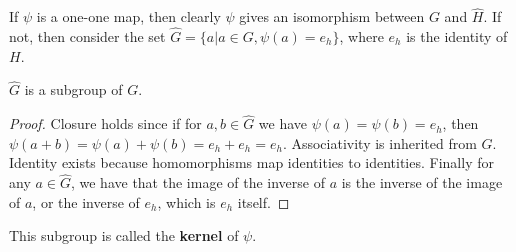 If $\psi$ is a one-one map, then clearly $\psi$ gives an isomorphism between $G$ and $\widehat{H}$.
If not, then consider the set $\widehat{G} = \{a | a \in G, \psi(a) = e_{h} \}$, where $e_{h}$ is the identity of $H$.
\begin{lemma} \label{lem:kernelsubgroup}
  $\widehat{G}$ is a subgroup of $G$.
\end{lemma}
\begin{proof}
  Closure holds since if for $a, b \in \widehat{G}$ we have $\psi(a) = \psi(b) = e_{h}$, then $\psi(a + b) = \psi(a) + \psi(b) = e_{h} + e_{h} = e_{h}$.
  Associativity is inherited from $G$.
  Identity exists because homomorphisms map identities to identities.
  Finally for any $a \in \widehat{G}$, we have that the image of the inverse of $a$ is the inverse of the image of $a$, or the inverse of $e_{h}$, which is $e_{h}$ itself.
\end{proof}
This subgroup is called the \textbf{kernel} of $\psi$.
